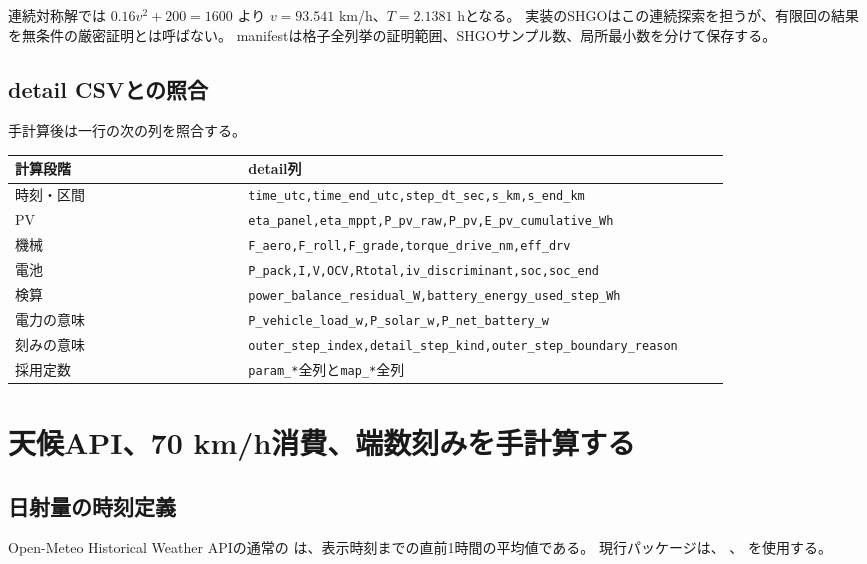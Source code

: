 連続対称解では $0.16v^2+200=1600$ より
$v=93.541$ km/h、$T=2.1381$ hとなる。
実装のSHGOはこの連続探索を担うが、有限回の結果を無条件の厳密証明とは呼ばない。
manifestは格子全列挙の証明範囲、SHGOサンプル数、局所最小数を分けて保存する。


\subsection{detail CSVとの照合}
手計算後は一行の次の列を照合する。
\begin{center}\small
\begin{tabular}{p{0.30\linewidth}p{0.62\linewidth}}
\toprule
計算段階&detail列\\\midrule
時刻・区間&\texttt{time\_utc,time\_end\_utc,step\_dt\_sec,s\_km,s\_end\_km}\\
PV&\texttt{eta\_panel,eta\_mppt,P\_pv\_raw,P\_pv,E\_pv\_cumulative\_Wh}\\
機械&\texttt{F\_aero,F\_roll,F\_grade,torque\_drive\_nm,eff\_drv}\\
電池&\texttt{P\_pack,I,V,OCV,Rtotal,iv\_discriminant,soc,soc\_end}\\
検算&\texttt{power\_balance\_residual\_W,battery\_energy\_used\_step\_Wh}\\
電力の意味&\texttt{P\_vehicle\_load\_w,P\_solar\_w,P\_net\_battery\_w}\\
刻みの意味&\texttt{outer\_step\_index,detail\_step\_kind,outer\_step\_boundary\_reason}\\
採用定数&\texttt{param\_*}全列と\texttt{map\_*}全列\\
\bottomrule
\end{tabular}
\end{center}


\section{天候API、70 km/h消費、端数刻みを手計算する}
\subsection{日射量の時刻定義}
Open-Meteo Historical Weather APIの通常の
は、表示時刻までの直前1時間の平均値である。
現行パッケージは、
、
を使用する。

